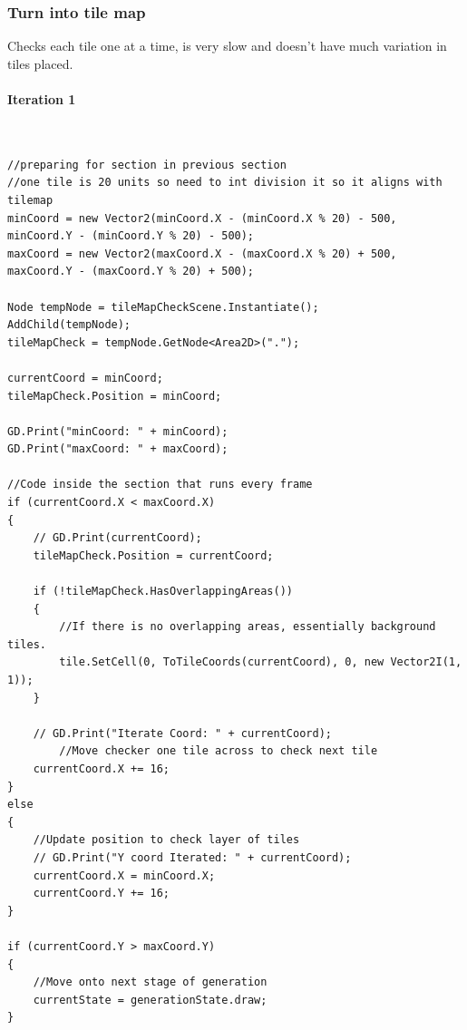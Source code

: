 \documentclass{article}
\newcommand{\myparagraph}[1]{\paragraph{#1}\mbox{}\\} %
\begin{document}
\subsubsection{Turn into tile map}
Checks each tile one at a time, is very slow and doesn't have much variation in tiles placed.
\myparagraph{Iteration 1}
\begin{lstlisting}
//preparing for section in previous section
//one tile is 20 units so need to int division it so it aligns with tilemap
minCoord = new Vector2(minCoord.X - (minCoord.X % 20) - 500, minCoord.Y - (minCoord.Y % 20) - 500);
maxCoord = new Vector2(maxCoord.X - (maxCoord.X % 20) + 500, maxCoord.Y - (maxCoord.Y % 20) + 500);

Node tempNode = tileMapCheckScene.Instantiate();
AddChild(tempNode);
tileMapCheck = tempNode.GetNode<Area2D>(".");

currentCoord = minCoord;
tileMapCheck.Position = minCoord;

GD.Print("minCoord: " + minCoord);
GD.Print("maxCoord: " + maxCoord);

//Code inside the section that runs every frame
if (currentCoord.X < maxCoord.X)
{
    // GD.Print(currentCoord);
    tileMapCheck.Position = currentCoord;

    if (!tileMapCheck.HasOverlappingAreas())
    {
    	//If there is no overlapping areas, essentially background tiles.
        tile.SetCell(0, ToTileCoords(currentCoord), 0, new Vector2I(1, 1));
    }

    // GD.Print("Iterate Coord: " + currentCoord);
    	//Move checker one tile across to check next tile
    currentCoord.X += 16;
}
else
{
	//Update position to check layer of tiles
    // GD.Print("Y coord Iterated: " + currentCoord);
    currentCoord.X = minCoord.X;
    currentCoord.Y += 16;
}

if (currentCoord.Y > maxCoord.Y)
{
	//Move onto next stage of generation
    currentState = generationState.draw;
}
\end{lstlisting}
\end{document}
